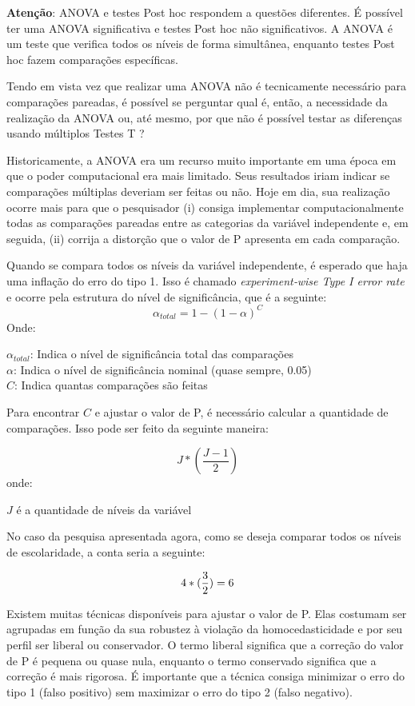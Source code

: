 \documentclass[
]{book}
\begin{document}
\textbf{Atenção}: ANOVA e testes Post hoc respondem a questões diferentes. É possível ter uma ANOVA significativa e testes Post hoc não significativos. A ANOVA é um teste que verifica todos os níveis de forma simultânea, enquanto testes Post hoc fazem comparações específicas.

Tendo em vista vez que realizar uma ANOVA não é tecnicamente necessário para comparações pareadas, é possível se perguntar qual é, então, a necessidade da realização da ANOVA ou, até mesmo, por que não é possível testar as diferenças usando múltiplos Testes T ?

Historicamente, a ANOVA era um recurso muito importante em uma época em que o poder computacional era mais limitado. Seus resultados iriam indicar se comparações múltiplas deveriam ser feitas ou não. Hoje em dia, sua realização ocorre mais para que o pesquisador (i) consiga implementar computacionalmente todas as comparações pareadas entre as categorias da variável independente e, em seguida, (ii) corrija a distorção que o valor de P apresenta em cada comparação.

Quando se compara todos os níveis da variável independente, é esperado que haja uma inflação do erro do tipo 1. Isso é chamado \emph{experiment‑wise Type I error rate} e ocorre pela estrutura do nível de significância, que é a seguinte:
\[\alpha_{total}=1-(1-\alpha)^C\]
Onde:

\(\alpha_{total}\): Indica o nível de significância total das comparações\\
\(\alpha\): Indica o nível de significância nominal (quase sempre, 0.05)\\
\(C\): Indica quantas comparações são feitas

Para encontrar \(C\) e ajustar o valor de P, é necessário calcular a quantidade de comparações. Isso pode ser feito da seguinte maneira:

\[J*(\frac{J-1}2)\]
onde:

\(J\) é a quantidade de níveis da variável

No caso da pesquisa apresentada agora, como se deseja comparar todos os níveis de escolaridade, a conta seria a seguinte:

\[4*(\frac{3}{2})\\=6\]

Existem muitas técnicas disponíveis para ajustar o valor de P. Elas costumam ser agrupadas em função da sua robustez à violação da homocedasticidade e por seu perfil ser liberal ou conservador. O termo liberal significa que a correção do valor de P é pequena ou quase nula, enquanto o termo conservado significa que a correção é mais rigorosa. É importante que a técnica consiga minimizar o erro do tipo 1 (falso positivo) sem maximizar o erro do tipo 2 (falso negativo).
\end{document}
